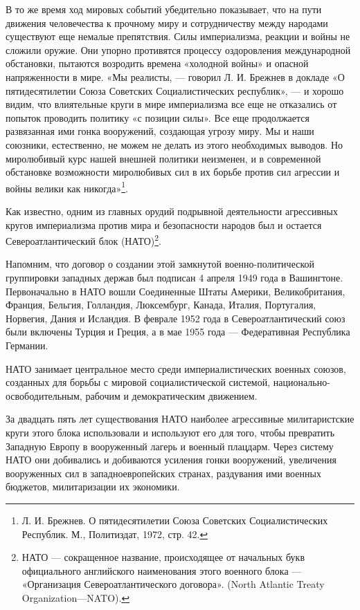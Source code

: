 \documentclass[12pt, a4paper, openany]{book}
\begin{document}
В то же время ход мировых событий убедительно показывает, что на пути движения человечества к прочному миру и сотрудничеству между народами существуют еще немалые препятствия. Силы империализма, реакции и войны не   сложили оружие. Они упорно противятся процессу оздоровления международной обстановки, пытаются возродить времена «холодной войны» и опасной напряженности в мире. «Мы реалисты, — говорил Л. И. Брежнев в докладе «О   пятидесятилетии Союза Советских Социалистических республик», — и хорошо видим, что влиятельные круги в мире империализма все еще не отказались от попыток проводить политику «с позиции силы». Все еще продолжается развязанная ими гонка вооружений, создающая угрозу миру. Мы и наши союзники, естественно, не можем не делать из этого необходимых выводов. Но миролюбивый курс нашей внешней политики   неизменен, и в современной обстановке возможности миролюбивых сил в их борьбе против сил агрессии и войны велики как никогда»{\footnote{Л. И. Брежнев. О пятидесятилетии Союза Советских Социалистических Республик. М., Политиздат, 1972, стр. 42.}}.

Как известно, одним из главных орудий подрывной деятельности агрессивных кругов империализма против мира и безопасности народов был и остается Североатлантический блок (НАТО){\footnote{НАТО — сокращенное название, происходящее от начальных букв официального английского наименования этого военного блока —  «Организация Североатлантического договора». (North Atlantic Treaty Organization—NATO).}}.

Напомним, что договор о создании этой замкнутой военно-политической группировки западных держав был подписан 4 апреля 1949 года в Вашингтоне. Первоначально в НАТО вошли Соединенные Штаты Америки, Великобритания,   Франция, Бельгия, Голландия, Люксембург, Канада, Италия, Португалия, Норвегия, Дания и Исландия. В феврале 1952 года в Североатлантический союз были включены Турция и Греция, а в мае 1955 года — Федеративная Республика Германии.

НАТО занимает центральное место среди империалистических военных союзов, созданных для борьбы с мировой социалистической системой, национально-освободительным, рабочим и демократическим движением.

За двадцать пять лет существования НАТО наиболее агрессивные милитаристские круги этого блока использовали и используют его для того, чтобы превратить Западную Европу в вооруженный лагерь и военный плацдарм. Через систему НАТО они добивались и добиваются усиления гонки  вооружений, увеличения вооруженных сил в западноевропейских странах, раздувания ими военных бюджетов, милитаризации их экономики.
\end{document}
